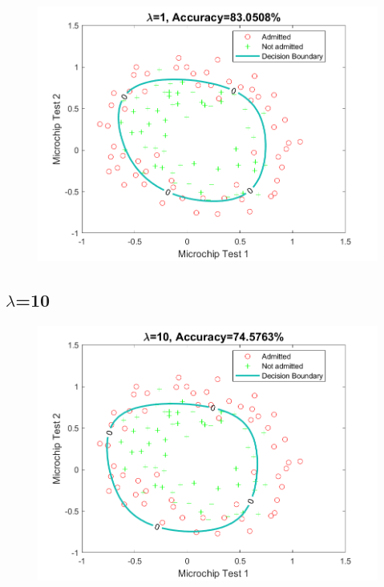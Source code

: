 \documentclass{article}
\begin{document}
\begin{figure}[H]
\includegraphics[scale = 0.75]{hwk4_problem2_lambda_1_plot.png}
\end{figure}

\subsection*{{$\lambda$}=10}


\begin{figure}[H]
\includegraphics[scale = 0.75]{hwk4_problem2_lambda_10_plot.png}
\end{figure}
\end{document}
